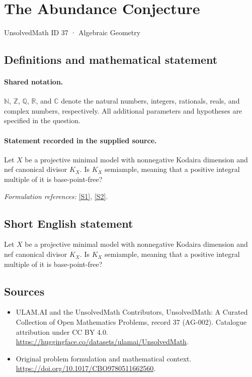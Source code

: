 \documentclass[11pt]{article}
\newcommand{\sref}[2]{\hyperlink{source:#1:#2}{[S#2]}}
\begin{document}
\setcounter{section}{36}
\section{The Abundance Conjecture}\label{37}
{\small UnsolvedMath ID 37 · Algebraic Geometry}
\subsection{Definitions and mathematical statement}

\paragraph{Shared notation.}$\mathbb N$, $\mathbb Z$, $\mathbb Q$, $\mathbb R$, and $\mathbb C$ denote the natural numbers, integers, rationals, reals, and complex numbers, respectively. All additional parameters and hypotheses are specified in the question.


\paragraph{Statement recorded in the supplied source.}
Let $X$ be a projective minimal model with nonnegative Kodaira dimension and nef canonical divisor $K_X$. Is $K_X$ semiample, meaning that a positive integral multiple of it is base-point-free?
\par\smallskip\textit{Formulation references:} \sref{37}{1}, \sref{37}{2}.
\subsection{Short English statement}
Let $X$ be a projective minimal model with nonnegative Kodaira dimension and nef canonical divisor $K_X$. Is $K_X$ semiample, meaning that a positive integral multiple of it is base-point-free?
\subsection{Sources}
\begin{itemize}
\item[\hypertarget{source:37:1}{S1}] ULAM.AI and the UnsolvedMath Contributors, UnsolvedMath: A Curated Collection of Open Mathematics Problems, record 37 (AG-002). Catalogue attribution under CC BY 4.0.
\url{https://huggingface.co/datasets/ulamai/UnsolvedMath}.
\item[\hypertarget{source:37:2}{S2}] Original problem formulation and mathematical context.
\url{https://doi.org/10.1017/CBO9780511662560}.
\end{itemize}
\label{end:37}
\end{document}
